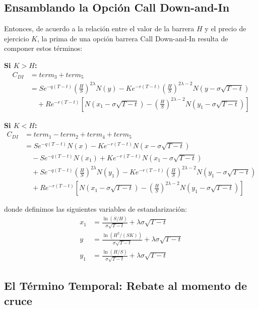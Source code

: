 \subsection{Ensamblando la Opción Call Down-and-In}

Entonces, de acuerdo a la relación entre el valor de la barrera $H$ y el precio de ejercicio $K$, la prima de una opción barrera Call Down-and-In resulta de componer estos términos:

\textbf{Si $K > H$:}
\begin{align}
C_{DI} &= term_3 + term_5 \nonumber \\
       &= S e^{-q(T-t)} \left(\frac{H}{S}\right)^{2\lambda} N(y) - K e^{-r(T-t)} \left(\frac{H}{S}\right)^{2\lambda - 2} N(y - \sigma\sqrt{T-t}) \nonumber \\
&\quad + R e^{-r(T-t)} \left[ N(x_1 - \sigma \sqrt{T-t}) - \left(\frac{H}{S}\right)^{2\lambda - 2} N(y_1 - \sigma\sqrt{T-t}) \right]
\end{align}

\textbf{Si $K < H$:}
\begin{align}
C_{DI} &= term_1 - term_2 + term_4 + term_5 \nonumber \\
       &= S e^{-q(T-t)} N(x) - K e^{-r(T-t)} N(x - \sigma\sqrt{T-t}) \nonumber \\
&\quad - S e^{-q(T-t)} N(x_1) + K e^{-r(T-t)} N(x_1 - \sigma\sqrt{T-t}) \nonumber \\
&\quad + S e^{-q(T-t)} \left(\frac{H}{S}\right)^{2\lambda} N(y_1) - K e^{-r(T-t)}\left(\frac{H}{S}\right)^{2\lambda - 2} N(y_1 - \sigma\sqrt{T-t}) \nonumber \\
&\quad + R e^{-r(T-t)} \left[ N(x_1 - \sigma \sqrt{T-t}) - \left(\frac{H}{S}\right)^{2\lambda - 2} N(y_1 - \sigma\sqrt{T-t}) \right]
\end{align}

donde definimos las siguientes variables de estandarización:
\begin{align}
x_1 &= \frac{\ln(S/H)}{\sigma \sqrt{T-t}} + \lambda\sigma \sqrt{T-t} \\
y &= \frac{\ln(H^2/(SK))}{\sigma \sqrt{T-t}} + \lambda\sigma \sqrt{T-t} \\
y_1 &= \frac{\ln(H/S)}{\sigma \sqrt{T-t}} + \lambda\sigma \sqrt{T-t}
\end{align}

\subsection{El Término Temporal: Rebate al momento de cruce}

